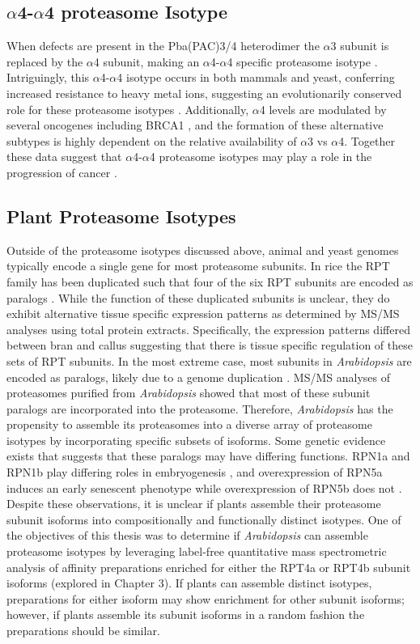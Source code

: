 \subsection{$\alpha$4-$\alpha$4 proteasome Isotype}
	When defects are present in the Pba(PAC)3/4 heterodimer the $\alpha$3 subunit is replaced by the $\alpha$4 subunit, making an $\alpha$4-$\alpha$4 specific proteasome isotype \citep{kusmierczyk08, padmanabhan16}.  Intriguingly, this $\alpha$4-$\alpha$4 isotype occurs in both mammals and yeast, conferring increased resistance to heavy metal ions, suggesting an evolutionarily conserved role for these proteasome isotypes \citep{kusmierczyk08, padmanabhan16}.  Additionally, $\alpha$4 levels are modulated by several oncogenes including BRCA1 \citep{li15}, and the formation of these alternative subtypes is highly dependent on the relative availability of $\alpha$3 vs $\alpha$4. Together these data suggest that $\alpha$4-$\alpha$4 proteasome isotypes may play a role in the progression of cancer \citep{padmanabhan16}.
\FloatBarrier
\subsection{Plant Proteasome Isotypes}
	Outside of the proteasome isotypes discussed above, animal and yeast genomes typically encode a single gene for most proteasome subunits. In rice the RPT family has been duplicated such that four of the six RPT subunits are encoded as paralogs \citep{shibahara04}. While the function of these duplicated subunits is unclear, they do exhibit alternative tissue specific expression patterns as determined by MS/MS analyses using total protein extracts. Specifically, the expression patterns differed between bran and callus suggesting that there is tissue specific regulation of these sets of RPT subunits. 
In the most extreme case, most subunits in \textit{Arabidopsis} are encoded as paralogs, likely due to a genome duplication \citep{book10, fu98}. MS/MS analyses of proteasomes purified from \textit{Arabidopsis} showed that most of these subunit paralogs are incorporated into the proteasome. Therefore, \textit{Arabidopsis} has the propensity to assemble its proteasomes into a diverse array of proteasome isotypes by incorporating specific subsets of isoforms. Some genetic evidence exists that suggests that these paralogs may have differing functions. RPN1a and RPN1b play differing roles in embryogenesis \citep{brukhin05}, and overexpression of RPN5a induces an early senescent phenotype while overexpression of RPN5b does not \citep{book09}.  Despite these observations, it is unclear if plants assemble their proteasome subunit isoforms into compositionally and functionally distinct isotypes. One of the objectives of this thesis was to determine if \textit{Arabidopsis} can assemble proteasome isotypes by leveraging label-free quantitative mass spectrometric analysis of affinity preparations enriched for either the RPT4a or RPT4b subunit isoforms (explored in Chapter 3). If plants can assemble distinct isotypes, preparations for either isoform may show enrichment for other subunit isoforms; however, if plants assemble its subunit isoforms in a random fashion the preparations should be similar. 


